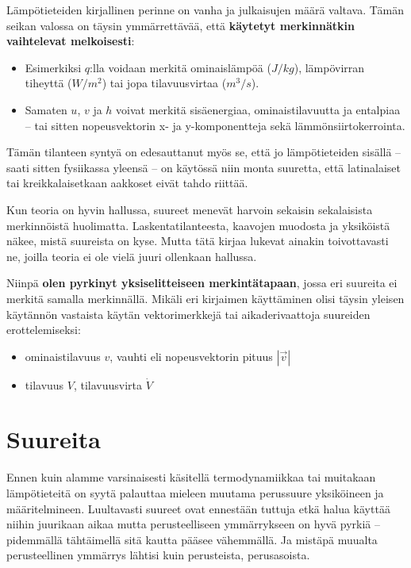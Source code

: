 \documentclass[12pt,a4paper,finnish]{book}
\begin{document}
Lämpötieteiden kirjallinen perinne on vanha ja julkaisujen määrä valtava. Tämän seikan valossa on täysin 
ymmärrettävää, että \textbf{käytetyt merkinnätkin vaihtelevat melkoisesti}:

\begin{itemize}
 \item Esimerkiksi $q$:lla voidaan merkitä ominaislämpöä ($J/kg$), lämpövirran tiheyttä ($W/m^2$) tai jopa 
  tilavuusvirtaa ($m^3/s$). 
 \item Samaten $u$, $v$ ja $h$ voivat merkitä sisäenergiaa, ominaistilavuutta ja entalpiaa -- tai 
  sitten nopeusvektorin x- ja y-komponentteja sekä lämmönsiirtokerrointa.
\end{itemize}
  
Tämän tilanteen syntyä on edesauttanut myös se, että jo lämpötieteiden sisällä -- saati sitten fysiikassa 
yleensä -- on käytössä niin monta suuretta, että latinalaiset tai kreikkalaisetkaan aakkoset eivät tahdo riittää.

Kun teoria on hyvin hallussa, suureet menevät harvoin sekaisin sekalaisista merkinnöistä huolimatta. 
Laskentatilanteesta, kaavojen muodosta ja yksiköistä näkee, mistä suureista on kyse. Mutta tätä kirjaa 
lukevat ainakin toivottavasti ne, joilla teoria ei ole vielä juuri ollenkaan hallussa.

Niinpä \textbf{olen pyrkinyt yksiselitteiseen merkintätapaan}, jossa eri suureita ei merkitä samalla merkinnällä. 
Mikäli eri kirjaimen käyttäminen olisi täysin yleisen käytännön vastaista käytän vektorimerkkejä 
tai aikaderivaattoja  suureiden erottelemiseksi:
 
\begin{itemize}
 \item ominaistilavuus $v$, vauhti eli nopeusvektorin pituus $|\vec{v}|$
 \item tilavuus $V$, tilavuusvirta $\dot{V}$
\end{itemize}

\renewcommand{\thepart}{\arabic{part}}
\setcounter{part}{-1}
\part{Suureita} %
\setcounter{chapter}{0}
\renewcommand{\thesection}{\arabic{chapter}.\arabic{section}}

Ennen kuin alamme varsinaisesti käsitellä termodynamiikkaa tai muitakaan lämpötieteitä on syytä palauttaa mieleen 
muutama perussuure yksiköineen ja määritelmineen. Luultavasti suureet ovat ennestään tuttuja etkä halua käyttää 
niihin juurikaan aikaa mutta perusteelliseen ymmärrykseen on hyvä pyrkiä -- pidemmällä tähtäimellä sitä kautta 
pääsee vähemmällä. Ja mistäpä muualta perusteellinen ymmärrys lähtisi kuin perusteista, perusasoista.
\end{document}
